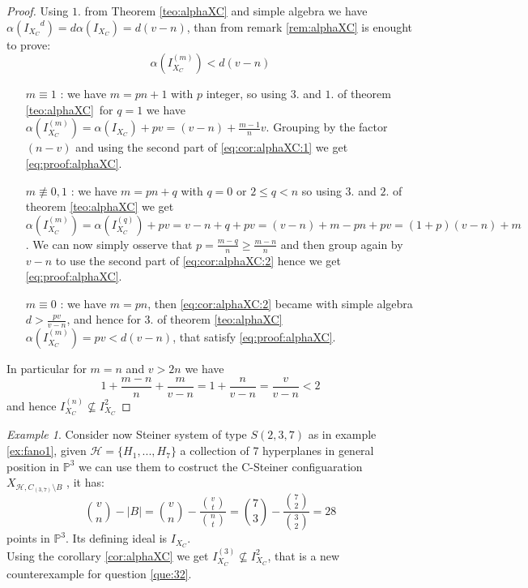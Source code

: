 \documentclass[]{book}
\theoremstyle{plain}
\theoremstyle{remark}
\newtheorem{ex}[rem]{Example}
\theoremstyle{definition}
\newcommand{\PP}{\mathbb{P}}
\newcommand{\HH}{\mathcal{H}}
\DeclareMathOperator*{\eqb }{=}
\begin{document}
 \begin{proof}
 Using $ 1. $ from Theorem \ref{teo:alphaXC} and simple algebra we have $ \alpha({I_{X_C}}^d) = d\alpha(I_{X_C}) = d(v- n) $, than from remark \ref{rem:alphaXC} is enought to prove:
 \begin{equation}\label{eq:proof:alphaXC}
 \alpha(I_{X_C}^{(m)}) < d(v-n)
 \end{equation}
 \begin{itemize}
 \item[$m \equiv 1$ : ] we have $ m = pn + 1 $ with $ p $ integer, so using $ 3. $ and $ 1. $ of theorem \ref{teo:alphaXC} for $ q = 1 $ we have $  \alpha(I_{X_C}^{(m)}) \eqb \alpha(I_{X_C} ) + pv \eqb (v-n) + \frac{m-1}{n}v  $. Grouping by the factor $ (n-v) $ and using the second part of \ref{eq:cor:alphaXC:1} we get \ref{eq:proof:alphaXC}. 
 \item[$m \not\equiv 0,1$ : ] we have $ m = pn + q $ with $ q = 0 $ or $ 2 \leq q < n $ so using $ 3. $ and $ 2. $ of theorem \ref{teo:alphaXC} we get  $  \alpha(I_{X_C}^{(m)}) \eqb \alpha(I_{X_C}^{(q)} ) + pv \eqb v - n + q  +pv = (v - n) + m -pn +pv = (1 + p)(v - n) + m $. We can now simply osserve that $ p = \frac{m-q}{n} \geq \frac{m-n}{n} $ and then group again by $ v-n $ to use the second part of \ref{eq:cor:alphaXC:2} hence we get \ref{eq:proof:alphaXC}.
 \item[$ m\equiv 0 $ : ] we have $ m=pn $, then \ref{eq:cor:alphaXC:2} became with simple algebra $ d > \frac{pv}{v-n} $, and hence for $ 3. $ of theorem \ref{teo:alphaXC} $  \alpha(I_{X_C}^{(m)})= pv < d(v-n)$, that satisfy \ref{eq:proof:alphaXC}. 
 \end{itemize}
 In particular for $ m=n $ and $ v > 2n $ we have 
 \[ 1 +\frac{ m - n }{ n } + \frac{ m }{ v - n } = 1 + \frac{ n }{ v - n }= \frac{ v }{ v - n } < 2 \]
 and hence $ I_{X_C}^{(n)} \not \subseteq I_{X_C}^2  $
 \end{proof}
 
 \begin{ex}\label{ex:fano2}
 Consider now Steiner system of type $ S(2,3,7) $ as in example \ref{ex:fano1}, given $ \HH = \{ H_1 , ... , H_7 \} $ a collection of 7 hyperplanes in general position in $ \PP^3 $ we can use them to costruct the C-Steiner configuaration $ X_{\HH , C_{(3,7)} \setminus B} $ , it has:
 \[
 \binom{v}{n} - |B| = \binom{v}{n} -  \frac{\binom{v}{t}}{\binom{n}{t}} = \binom{7}{3} -  \frac{\binom{7}{2}}{\binom{3}{2}} = 28
 \]
 points in $ \PP^3 $. Its defining ideal is  $ I_{X_C} $. \\
 Using the corollary \ref{cor:alphaXC} we get $ I_{X_C}^{(3)}  \not \subseteq I_{X_C}^2$, that is a new counterexample for question \ref{que:32}. 
 \end{ex}
 
\end{document}
